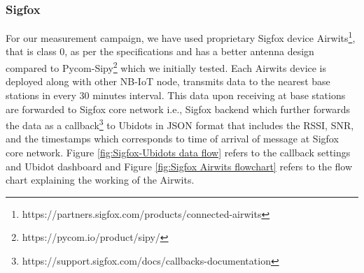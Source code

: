 \documentclass[12pt]{article}
\begin{document}
\subsubsection{Sigfox}\label{sigfox experimental setup}
For our measurement campaign, we have used proprietary Sigfox device Airwits\footnote{https://partners.sigfox.com/products/connected-airwits}, that is class 0, as per the specifications and has a better antenna design compared to Pycom-Sipy\footnote{https://pycom.io/product/sipy/} which we initially tested. Each Airwits device is deployed along with other NB-IoT node, transmits data to the nearest base stations in every 30 minutes interval. This data upon receiving at base stations are forwarded to Sigfox core network i.e., Sigfox backend which further forwards the data as a callback\footnote{https://support.sigfox.com/docs/callbacks-documentation} to Ubidots in JSON format that includes the RSSI, SNR, and the timestamps which corresponds to time of arrival of message at Sigfox core network. Figure \ref{fig:Sigfox-Ubidots data flow} refers to the callback settings and Ubidot dashboard and Figure \ref{fig:Sigfox Airwits flowchart} refers to the flow chart explaining the working of the Airwits.
\end{document}
